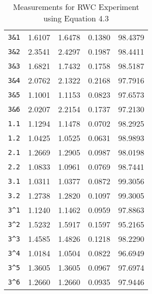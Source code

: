 \begin{table}[htb]
\begin{tabular}{lllll}
      \texttt{3\&1} & 1.6107 & 1.6478 & 0.1380 & 98.4379 \\
      \texttt{3\&2} & 2.3541 & 2.4297 & 0.1987 & 98.4411 \\
      \texttt{3\&3} & 1.6821 & 1.7432 & 0.1758 & 98.5187 \\
      \texttt{3\&4} & 2.0762 & 2.1322 & 0.2168 & 97.7916 \\
      \texttt{3\&5} & 1.1001 & 1.1153 & 0.0823 & 97.6573 \\
      \texttt{3\&6} & 2.0207 & 2.2154 & 0.1737 & 97.2130 \\
      \texttt{1.1} & 1.1294 & 1.1478 & 0.0702 & 98.2925 \\
      \texttt{1.2} & 1.0425 & 1.0525 & 0.0631 & 98.9893 \\
      \texttt{2.1} & 1.2669 & 1.2905 & 0.0987 & 98.0198 \\
      \texttt{2.2} & 1.0833 & 1.0961 & 0.0769 & 98.7441 \\
      \texttt{3.1} & 1.0311 & 1.0377 & 0.0872 & 99.3056 \\
      \texttt{3.2} & 1.2738 & 1.2820 & 0.1097 & 99.3005 \\
      \texttt{3\textasciicircum1} & 1.1240 & 1.1462 & 0.0959 & 97.8863 \\
      \texttt{3\textasciicircum2} & 1.5232 & 1.5917 & 0.1597 & 95.2165 \\
      \texttt{3\textasciicircum3} & 1.4585 & 1.4826 & 0.1218 & 98.2290 \\
      \texttt{3\textasciicircum4} & 1.0184 & 1.0504 & 0.0822 & 96.6949 \\
      \texttt{3\textasciicircum5} & 1.3605 & 1.3605 & 0.0967 & 97.6974 \\
      \texttt{3\textasciicircum6} & 1.2660 & 1.2660 & 0.0935 & 97.9446 \\
    \bottomrule
  \end{tabular}
  \caption{%
    Measurements for RWC Experiment using Equation 4.3
  }
  \label{tab:Packages}
\end{table}
%

